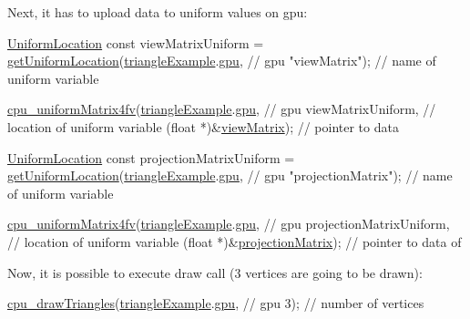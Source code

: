 Next, it has to upload data to uniform values on gpu\-: 
\begin{DoxyCodeInclude}
  \hyperlink{uniforms_8h_a0827d09b4e6a18f2718775e7e9289fbd}{UniformLocation} \textcolor{keyword}{const} viewMatrixUniform =
      \hyperlink{uniforms_8h_a6ea94982618b1c339a97a528b0670a53}{getUniformLocation}(\hyperlink{triangleExample_8c_a235d77635ad30ec86f81d2caabbdc1b5}{triangleExample}.\hyperlink{structTriangleExampleVariables_a6c5c3f82065ae9aac07f9e6f11dd03b3}{gpu},  \textcolor{comment}{// gpu}
                         \textcolor{stringliteral}{"viewMatrix"});        \textcolor{comment}{// name of uniform variable}

  \hyperlink{uniforms_8h_a44cfae8c541efcc181e3947511df7f7a}{cpu\_uniformMatrix4fv}(\hyperlink{triangleExample_8c_a235d77635ad30ec86f81d2caabbdc1b5}{triangleExample}.\hyperlink{structTriangleExampleVariables_a6c5c3f82065ae9aac07f9e6f11dd03b3}{gpu},    \textcolor{comment}{// gpu}
                       viewMatrixUniform,      \textcolor{comment}{// location of uniform variable}
                       (\textcolor{keywordtype}{float} *)&\hyperlink{globals_8c_ae64ebe4c77936fc93d161b97bd8e96df}{viewMatrix});  \textcolor{comment}{// pointer to data}

  \hyperlink{uniforms_8h_a0827d09b4e6a18f2718775e7e9289fbd}{UniformLocation} \textcolor{keyword}{const} projectionMatrixUniform =
      \hyperlink{uniforms_8h_a6ea94982618b1c339a97a528b0670a53}{getUniformLocation}(\hyperlink{triangleExample_8c_a235d77635ad30ec86f81d2caabbdc1b5}{triangleExample}.\hyperlink{structTriangleExampleVariables_a6c5c3f82065ae9aac07f9e6f11dd03b3}{gpu},  \textcolor{comment}{// gpu}
                         \textcolor{stringliteral}{"projectionMatrix"});  \textcolor{comment}{// name of uniform variable}

  \hyperlink{uniforms_8h_a44cfae8c541efcc181e3947511df7f7a}{cpu\_uniformMatrix4fv}(\hyperlink{triangleExample_8c_a235d77635ad30ec86f81d2caabbdc1b5}{triangleExample}.\hyperlink{structTriangleExampleVariables_a6c5c3f82065ae9aac07f9e6f11dd03b3}{gpu},      \textcolor{comment}{// gpu}
                       projectionMatrixUniform,  \textcolor{comment}{// location of uniform variable}
                       (\textcolor{keywordtype}{float} *)&\hyperlink{globals_8c_a1f344d924f733a22d7659db612a0efe8}{projectionMatrix});  \textcolor{comment}{// pointer to data of}
\end{DoxyCodeInclude}
Now, it is possible to execute draw call (3 vertices are going to be drawn)\-: 
\begin{DoxyCodeInclude}
  \hyperlink{student__pipeline_8c_aa47deaa10ce52221ab24e864a11426af}{cpu\_drawTriangles}(\hyperlink{triangleExample_8c_a235d77635ad30ec86f81d2caabbdc1b5}{triangleExample}.\hyperlink{structTriangleExampleVariables_a6c5c3f82065ae9aac07f9e6f11dd03b3}{gpu},  \textcolor{comment}{// gpu}
                    3);                   \textcolor{comment}{// number of vertices}
\end{DoxyCodeInclude}
